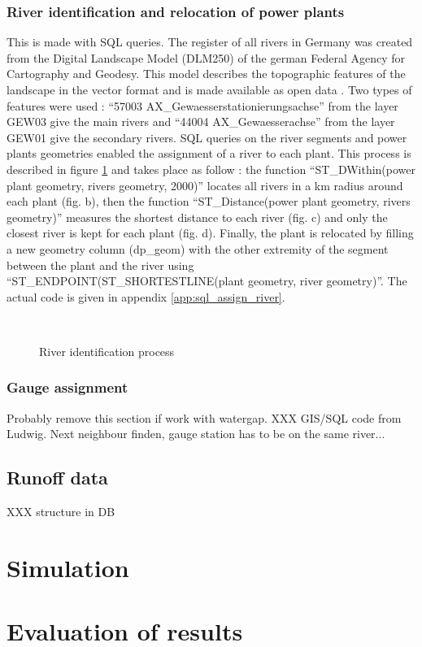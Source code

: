 \subsubsection*{River identification and relocation of power plants}

This is made with SQL queries. The register of all rivers in Germany was created from the Digital Landscape Model (DLM250) of the german Federal Agency for Cartography and Geodesy. This model describes the topographic features of the landscape in the vector format and is made available as open data \cite{dlm250}. Two types of features were used : ``57003 AX{\_}Gewaesserstationierungsachse'' from the layer GEW03 give the main rivers and ``44004 AX{\_}Gewaesserachse'' from the layer GEW01 give the secondary rivers. SQL queries on the river segments and power plants geometries enabled the assignment of a river to each plant. This process is described in figure \ref{river_id} and takes place as follow : the function ``ST{\_}DWithin(power plant geometry, rivers geometry, 2000)'' locates all rivers in a \unit[2]{km} radius around each plant (fig. b), then the function ``ST{\_}Distance(power plant geometry, rivers geometry)'' measures the  shortest distance to each river (fig. c) and only the closest river is kept for each plant (fig. d). Finally, the plant is relocated by filling a new geometry column (dp{\_}geom) with the other extremity of the segment between the plant and the river using ``ST{\_}ENDPOINT(ST{\_}SHORTESTLINE(plant geometry, river geometry)''. The actual code is given in appendix \ref{app:sql_assign_river}.
\begin{figure}[H]
\begin{center}
  \\
\end{center}
\caption{River identification process}
\label{river_id}
\end{figure}

\subsubsection*{Gauge assignment}
Probably remove this section if work with watergap.
XXX GIS/SQL code from Ludwig. Next neighbour finden, gauge station has to be on the same river...
\subsection{Runoff data}

XXX structure in DB

\section{Simulation}

\section{Evaluation of results}

